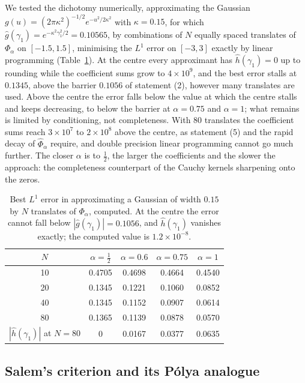 We tested the dichotomy numerically, approximating the Gaussian $g(u)=(2\pi\kappa^2)^{-1/2}e^{-u^2/2\kappa^2}$ with $\kappa=0.15$, for which $\hat g(\gamma_1)=e^{-\kappa^2\gamma_1^2/2}=0.10565$, by combinations of $N$ equally spaced translates of $\Phi_\alpha$ on $[-1.5,1.5]$, minimising the $L^1$ error on $[-3,3]$ exactly by linear programming (Table~\ref{wr:tab:wiener}). At the centre every approximant has $\hat h(\gamma_1)=0$ up to rounding while the coefficient sums grow to $4\times10^9$, and the best error stalls at $0.1345$, above the barrier $0.1056$ of statement (2), however many translates are used. Above the centre the error falls below the value at which the centre stalls and keeps decreasing, to below the barrier at $\alpha=0.75$ and $\alpha=1$; what remains is limited by conditioning, not completeness. With $80$ translates the coefficient sums reach $3\times10^7$ to $2\times10^8$ above the centre, as statement (5) and the rapid decay of $\hat\Phi_\alpha$ require, and double precision linear programming cannot go much further. The closer $\alpha$ is to $\frac12$, the larger the coefficients and the slower the approach: the completeness counterpart of the Cauchy kernels sharpening onto the zeros.

\begin{table}[htbp]
\centering\small
\begin{tabular}{ccccc}
\toprule
$N$ & $\alpha=\frac12$ & $\alpha=0.6$ & $\alpha=0.75$ & $\alpha=1$\\
\midrule
10 & 0.4705 & 0.4698 & 0.4664 & 0.4540\\
20 & 0.1345 & 0.1221 & 0.1060 & 0.0852\\
40 & 0.1345 & 0.1152 & 0.0907 & 0.0614\\
80 & 0.1365 & 0.1139 & 0.0878 & 0.0570\\
\midrule
$|\hat h(\gamma_1)|$ at $N=80$ & $0$ & 0.0167 & 0.0377 & 0.0635\\
\bottomrule
\end{tabular}
\caption{Best $L^1$ error in approximating a Gaussian of width $0.15$ by $N$ translates of $\Phi_\alpha$, computed. At the centre the error cannot fall below $|\hat g(\gamma_1)|=0.1056$, and $\hat h(\gamma_1)$ vanishes exactly; the computed value is $1.2\times10^{-8}$.}
\label{wr:tab:wiener}
\end{table}

\subsection{Salem's criterion and its P\'olya analogue}\label{wr:sec:salem}

